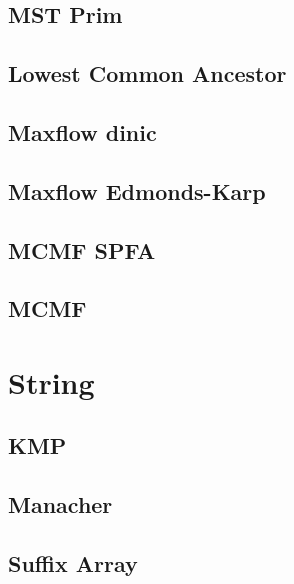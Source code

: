 \documentclass[10pt,landscape,a4paper,twocolumn]{article}
\begin{document}
\subsection{MST Prim}


\subsection{Lowest Common Ancestor}



\subsection{Maxflow dinic}


\subsection{Maxflow Edmonds-Karp}


\subsection{MCMF SPFA}


\subsection{MCMF}



\section{String}
\subsection{KMP}


\subsection{Manacher}


\subsection{Suffix Array}

\end{document}
